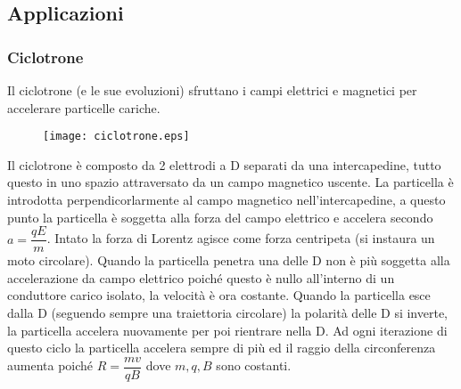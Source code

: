 \documentclass[dvips]{article}
\begin{document}
\subsection{Applicazioni}
\subsubsection{Ciclotrone}
Il ciclotrone (e le sue evoluzioni) sfruttano i campi elettrici e magnetici per accelerare particelle cariche.
\begin{figure}[H]
    \centering
    \texttt{[image: ciclotrone.eps]}
\end{figure}
Il ciclotrone è composto da 2 elettrodi a D separati da una intercapedine, tutto questo in uno spazio attraversato da un campo magnetico uscente. La particella è introdotta perpendicorlarmente al campo magnetico nell'intercapedine, a questo punto la particella è soggetta alla forza del campo elettrico e accelera secondo $a = \dfrac{qE}{m}$. Intato la forza di Lorentz agisce come forza centripeta (si instaura un moto circolare). Quando la particella penetra una delle D non è più soggetta alla accelerazione da campo elettrico poiché questo è nullo all'interno di un conduttore carico isolato, la velocità è ora costante. Quando la particella esce dalla D (seguendo sempre una traiettoria circolare) la polarità delle D si inverte, la particella accelera nuovamente per poi rientrare nella D. Ad ogni iterazione di questo ciclo la particella accelera sempre di più ed il raggio della circonferenza aumenta poiché $R = \dfrac{mv}{qB}$ dove $m, q, B$ sono costanti. 
\end{document}
